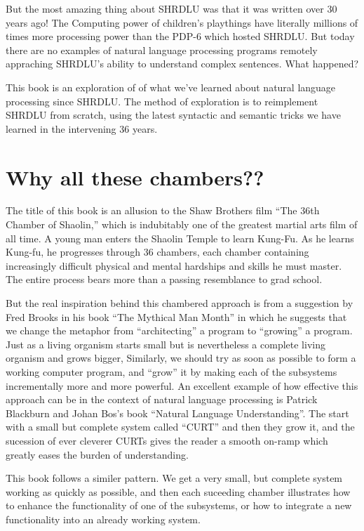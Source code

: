 \documentclass{book}[9pt]
\begin{document}
But the most amazing thing about SHRDLU was that it was written over
30 years ago!  The Computing power of children's playthings have
literally millions of times more processing power than the PDP-6 which
hosted SHRDLU.  But today there are no examples of natural language
processing programs remotely appraching SHRDLU's ability to understand
complex sentences.  What happened?

This book is an exploration of of what we've learned about natural
language processing since SHRDLU.  The method of exploration is to
reimplement SHRDLU from scratch, using the latest syntactic and
semantic tricks we have learned in the intervening 36 years.

\section{Why all these chambers??}

The title of this book is an allusion to the Shaw Brothers film ``The
36th Chamber of Shaolin,'' which is indubitably one of the greatest
martial arts film of all time.  A young man enters the Shaolin Temple
to learn Kung-Fu.  As he learns Kung-fu, he progresses through 36
chambers, each chamber containing increasingly difficult physical and
mental hardships and skills he must master.  The entire process bears
more than a passing resemblance to grad school.

But the real inspiration behind this chambered approach is from a
suggestion by Fred Brooks in his book ``The Mythical Man Month'' in
which he suggests that we change the metaphor from ``architecting'' a
program to ``growing'' a program.  Just as a living organism starts
small but is nevertheless a complete living organism and grows bigger,
Similarly, we should try as soon as possible to form a working
computer program, and ``grow'' it by making each of the subsystems
incrementally more and more powerful.  An excellent example of how
effective this approach can be in the context of natural language
processing is Patrick Blackburn and Johan Bos's book ``Natural
Language Understanding''.  The start with a small but complete system
called ``CURT'' and then they grow it, and the sucession of ever
cleverer CURTs gives the reader a smooth on-ramp which greatly eases
the burden of understanding.

This book follows a similer pattern.  We get a very small, but
complete system working as quickly as possible, and then each
suceeding chamber illustrates how to enhance the functionality of one
of the subsystems, or how to integrate a new functionality into an
already working system.
\end{document}

